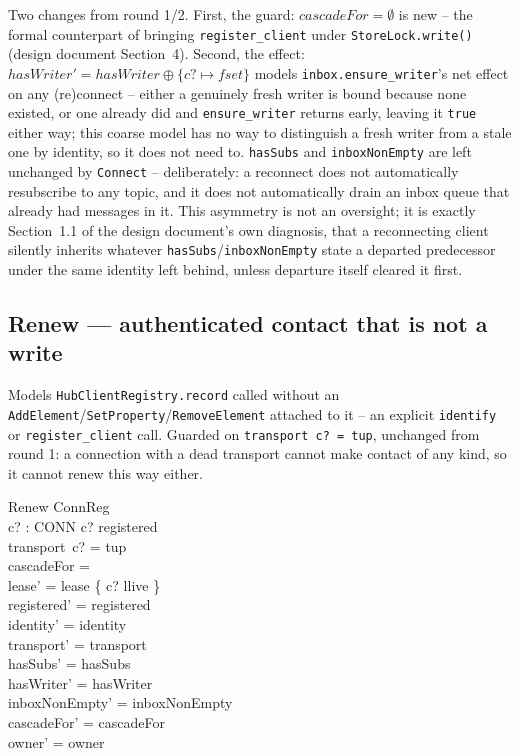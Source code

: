 \documentclass[a4paper,10pt,fleqn]{article}
\begin{document}
Two changes from round 1/2. First, the guard: \texttt{$cascadeFor = \emptyset$}
is new -- the formal counterpart of bringing \texttt{register\_client} under
\texttt{StoreLock.write()} (design document Section~4). Second, the effect:
\texttt{$hasWriter' = hasWriter \oplus \{c? \mapsto fset\}$} models
\texttt{inbox.ensure\_writer}'s net effect on any (re)connect -- either a
genuinely fresh writer is bound because none existed, or one already did and
\texttt{ensure\_writer} returns early, leaving it \texttt{true} either way;
this coarse model has no way to distinguish a fresh writer from a stale one
by identity, so it does not need to. \texttt{hasSubs} and
\texttt{inboxNonEmpty} are left unchanged by \texttt{Connect} -- deliberately:
a reconnect does not automatically resubscribe to any topic, and it does not
automatically drain an inbox queue that already had messages in it. This
asymmetry is not an oversight; it is exactly Section~1.1 of the design
document's own diagnosis, that a reconnecting client silently inherits
whatever \texttt{hasSubs}/\texttt{inboxNonEmpty} state a departed
predecessor under the same identity left behind, unless departure itself
cleared it first.

\subsection{Renew --- authenticated contact that is not a write}

Models \texttt{HubClientRegistry.record} called without an
\texttt{AddElement}/\texttt{SetProperty}/\texttt{RemoveElement} attached
to it -- an explicit \texttt{identify} or \texttt{register\_client} call.
Guarded on \texttt{transport~c? = tup}, unchanged from round 1: a
connection with a dead transport cannot make contact of any kind, so it
cannot renew this way either.

\begin{schema}{Renew}
  \Delta ConnReg \\
  c? : CONN
\where
  c? \in registered \\
  transport~c? = tup \\
  cascadeFor = \emptyset \\
  lease' = lease \oplus \{ c? \mapsto llive \} \\
  registered' = registered \\
  identity' = identity \\
  transport' = transport \\
  hasSubs' = hasSubs \\
  hasWriter' = hasWriter \\
  inboxNonEmpty' = inboxNonEmpty \\
  cascadeFor' = cascadeFor \\
  owner' = owner
\end{schema}
\end{document}
